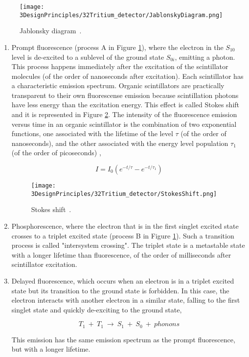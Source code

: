 \begin{figure}[htbp]
\centering
\texttt{[image: 3DesignPrinciples/32Tritium\_detector/JablonskyDiagram.png]}
\caption{Jablonsky diagram\label{fig:JablonskyDiagram}~\cite{Knoll}.}
\end{figure}

\begin{enumerate}

\item{} Prompt fluorescence (process A in Figure \ref{fig:JablonskyDiagram}), where the electron in the $S_{10}$ level  is de-excited to a sublevel of the ground state $S_{0i}$, emitting a photon. This process happens immediately after the excitation of the scintillator molecules (of the order of nanoseconds after excitation). Each scintillator has a characteristic emission spectrum. Organic scintillators are practically transparent to their own fluorescense emission because scintillation photons have less energy than the excitation energy. This effect is called Stokes shift and it is represented in Figure \ref{fig:StokesShift}. The intensity of the fluorescence emission versus time in an organic scintillator is the combination of two exponential functions, one associated with the lifetime of the level $\tau$ (of the order of nanoseconds), and the other associated with the energy level population $\tau_1$ (of the order of picoseconds) \cite{Knoll},

\begin{equation}
I=I_0\left(e^{-t/\tau} - e^{-t/\tau_1}\right) 
\label{eq:IntensityTimeScintillator}
\end{equation}

\begin{figure}[htbp]
\centering
\texttt{[image: 3DesignPrinciples/32Tritium\_detector/StokesShift.png]}
\caption{Stokes shift\label{fig:StokesShift}~\cite{Knoll}.}
\end{figure}

\item{} Phosphorescence, where the electron that is in the first singlet excited state crosses to a triplet excited state (process B in Figure \ref{fig:JablonskyDiagram}). Such a transition process is called "intersystem crossing". The triplet state is a metastable state with a longer lifetime than fluorescence, of the order of milliseconds after scintillator excitation.

\item{} Delayed fluorescence, which occurs when an electron is in a triplet excited state but its transition to the ground state is forbidden. In this case, the electron interacts with another electron in a similar state, falling to the first singlet state and quickly de-exciting to the ground state, 

\begin{equation}
T_{1} ~+~ T_{1}~ \longrightarrow ~ S_{1} ~+~ S_{0} ~+~ phonons
\label{eq:DelayFluorescence}
\end{equation}

This emission has the same emission spectrum as the prompt fluorescence, but with a longer lifetime.
\end{enumerate}

